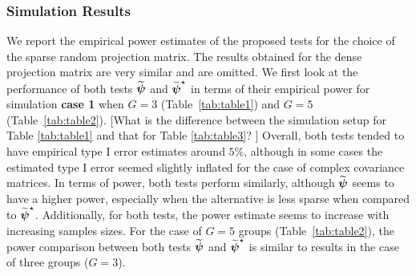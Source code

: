 \documentclass[times,sort&compress,3p]{elsarticle}
\theoremstyle{plain}%
\theoremstyle{definition}
\def\boldpsi{{\mbox{\boldmath $\psi$}}}
\begin{document}
\subsubsection{Simulation Results}
We report the empirical power estimates of the proposed tests for the choice of the sparse random projection matrix. The results obtained for the dense projection matrix are very similar and are omitted. We first look at the performance of both tests $\widetilde{\boldpsi}$ and $\widetilde{\boldpsi}^{\star}$ in terms of their empirical power for simulation {\bf case 1} when $G=3$ (Table~\ref{tab:table1}) and $G=5$ (Table~\ref{tab:table2}). {\color{blue}[What is the difference between the simulation setup for Table \ref{tab:table1} and that for Table \ref{tab:table3}? ]}
Overall, both tests tended to have empirical type I error estimates around $5\%$, although in some cases the estimated type I error seemed slightly inflated for the case of complex covariance matrices. In terms of power, both tests perform similarly, although $\widetilde{\boldpsi}$ seems to have a higher power, especially when the alternative is less sparse when compared to $\widetilde{\boldpsi}^{\star}$. Additionally, for both tests, the power estimate seems to increase with increasing samples sizes. For the case of $G=5$ groups (Table~\ref{tab:table2}), the power comparison between both tests $\widetilde{\boldpsi}$ and $\widetilde{\boldpsi}^{\star}$ is similar to results in the case of three groups ($G=3$).
\end{document}
